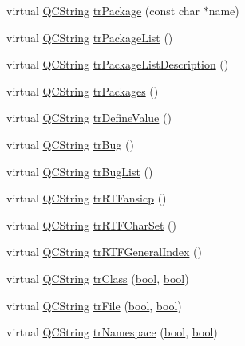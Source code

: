\begin{DoxyCompactItemize}
\item 
virtual \hyperlink{class_q_c_string}{Q\+C\+String} \hyperlink{class_translator_chinese_a76e192cdf39ae132fa1d30f757897d58}{tr\+Package} (const char $\ast$name)
\item 
virtual \hyperlink{class_q_c_string}{Q\+C\+String} \hyperlink{class_translator_chinese_a1d59869229bf4e9dab9ae80bcbaddb69}{tr\+Package\+List} ()
\item 
virtual \hyperlink{class_q_c_string}{Q\+C\+String} \hyperlink{class_translator_chinese_ab80bf19ed8915624a5ad251f5c8d217e}{tr\+Package\+List\+Description} ()
\item 
virtual \hyperlink{class_q_c_string}{Q\+C\+String} \hyperlink{class_translator_chinese_a46fb6bff7f64ae756eabaac2bc387d0a}{tr\+Packages} ()
\item 
virtual \hyperlink{class_q_c_string}{Q\+C\+String} \hyperlink{class_translator_chinese_a2b16ef7110e8834820d94724976da3cc}{tr\+Define\+Value} ()
\item 
virtual \hyperlink{class_q_c_string}{Q\+C\+String} \hyperlink{class_translator_chinese_a80b2609b7331e1f71860bb099eca84c9}{tr\+Bug} ()
\item 
virtual \hyperlink{class_q_c_string}{Q\+C\+String} \hyperlink{class_translator_chinese_a7cbdbfd6285976a95fdde927d0624d14}{tr\+Bug\+List} ()
\item 
virtual \hyperlink{class_q_c_string}{Q\+C\+String} \hyperlink{class_translator_chinese_a4f6b051cede382e7d4234506aeaccedb}{tr\+R\+T\+Fansicp} ()
\item 
virtual \hyperlink{class_q_c_string}{Q\+C\+String} \hyperlink{class_translator_chinese_a0935a089ac2dc882cf25fe6cf1185fee}{tr\+R\+T\+F\+Char\+Set} ()
\item 
virtual \hyperlink{class_q_c_string}{Q\+C\+String} \hyperlink{class_translator_chinese_a7968e2923b5eaf5786248fc3839f516d}{tr\+R\+T\+F\+General\+Index} ()
\item 
virtual \hyperlink{class_q_c_string}{Q\+C\+String} \hyperlink{class_translator_chinese_ac8b43380d40165fb7f6f6e8baff04e3f}{tr\+Class} (\hyperlink{qglobal_8h_a1062901a7428fdd9c7f180f5e01ea056}{bool}, \hyperlink{qglobal_8h_a1062901a7428fdd9c7f180f5e01ea056}{bool})
\item 
virtual \hyperlink{class_q_c_string}{Q\+C\+String} \hyperlink{class_translator_chinese_aec3c0a7ad2bfc26114a576fd42c88435}{tr\+File} (\hyperlink{qglobal_8h_a1062901a7428fdd9c7f180f5e01ea056}{bool}, \hyperlink{qglobal_8h_a1062901a7428fdd9c7f180f5e01ea056}{bool})
\item 
virtual \hyperlink{class_q_c_string}{Q\+C\+String} \hyperlink{class_translator_chinese_a2ee387435759d7648133e813a574b27d}{tr\+Namespace} (\hyperlink{qglobal_8h_a1062901a7428fdd9c7f180f5e01ea056}{bool}, \hyperlink{qglobal_8h_a1062901a7428fdd9c7f180f5e01ea056}{bool})

\end{DoxyCompactItemize}
